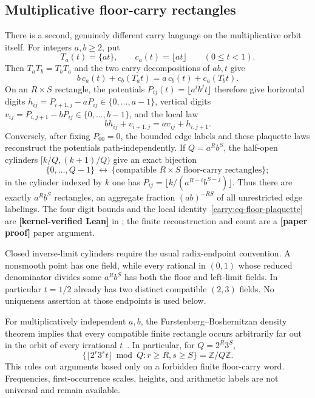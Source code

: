 \documentclass[11pt,oneside]{article}
\theoremstyle{definition}
\theoremstyle{remark}
\newcommand{\lean}[1]{\texttt{\detokenize{#1}}}
\newcommand{\statuslean}{\textcolor{leanblue}{\textbf{[kernel-verified Lean]}}}
\newcommand{\statusnew}{\textcolor{newgreen}{\textbf{[paper proof]}}}
\begin{document}
\subsection{Multiplicative floor-carry rectangles}
\label{carry:floor-rectangles}

There is a second, genuinely different carry language on the multiplicative orbit itself.
For integers $a,b\ge2$, put
\[
 T_a(t)=\{at\},\qquad c_a(t)=\lfloor at\rfloor\qquad(0\le t<1).
\]
Then $T_aT_b=T_bT_a$ and the two carry decompositions of $ab,t$ give
\begin{equation}
 b\,c_a(t)+c_b(T_a t)=a\,c_b(t)+c_a(T_b t).
 \label{carry:eq-floor-plaquette}
\end{equation}
On an $R\times S$ rectangle, the potentials
$P_{ij}(t)=\lfloor a^ib^jt\rfloor$ therefore give horizontal digits
$h_{ij}=P_{i+1,j}-aP_{ij}\in\{0,\ldots,a-1\}$, vertical digits
$v_{ij}=P_{i,j+1}-bP_{ij}\in\{0,\ldots,b-1\}$, and the local law
\[
 b h_{ij}+v_{i+1,j}=a v_{ij}+h_{i,j+1}.
\]
Conversely, after fixing $P_{00}=0$, the bounded edge labels and these plaquette laws
reconstruct the potentials path-independently.  If $Q=a^Rb^S$, the half-open cylinders
$[k/Q,(k+1)/Q)$ give an exact bijection
\begin{equation}
 \{0,\ldots,Q-1\}\ \longleftrightarrow\
 \{\text{compatible $R\times S$ floor-carry rectangles}\};
 \label{carry:eq-floor-rectangle-count}
\end{equation}
in the cylinder indexed by $k$ one has
$P_{ij}=\lfloor k/(a^{R-i}b^{S-j})\rfloor$.  Thus there are exactly $a^Rb^S$
rectangles, an aggregate fraction $(ab)^{-RS}$ of all unrestricted edge labelings.
The four digit bounds and the local identity~\eqref{carry:eq-floor-plaquette} are
\statuslean{} in \lean{MixedRadixCarryFinite}; the finite reconstruction and count are a
\statusnew{} paper argument.

Closed inverse-limit cylinders require the usual radix-endpoint convention.  A nonsmooth
point has one field, while every rational in $(0,1)$ whose reduced denominator divides
some $a^Rb^S$ has both the floor and left-limit fields.  In particular $t=1/2$ already has
two distinct compatible $(2,3)$ fields.  No uniqueness assertion at those endpoints is
used below.

For multiplicatively independent $a,b$, the Furstenberg--Boshernitzan density theorem
implies that every compatible finite rectangle occurs arbitrarily far out in the orbit of
every irrational $t$~\cite{Boshernitzan1994}.  In particular, for $Q=2^R3^S$,
\begin{equation}
 \{\lfloor2^r3^s t\rfloor\bmod Q:r\ge R, s\ge S\}=\mathbb Z/Q\mathbb Z.
 \label{carry:eq-complete-smooth-residues}
\end{equation}
This rules out arguments based only on a forbidden finite floor-carry word.  Frequencies,
first-occurrence scales, heights, and arithmetic labels are not universal and remain
available.
\end{document}
